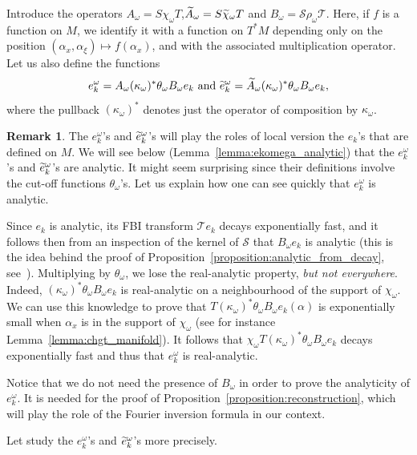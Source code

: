 \documentclass[10pt]{amsart}
\theoremstyle{definition}\newtheorem{defi}[theo]{Definition}\newtheorem{rema}[theo]{Remark}\newtheorem{exam}[theo]{Example}\newtheorem{exem}[theo]{Example}\newtheorem{nota}[theo]{Notation}
\newcommand{\clT}{\mathcal{T}}
\newcommand{\clS}{\mathcal{S}}
\let\oldtilde\tilde
\renewcommand*{\tilde}[1]{\mathchoice{\widetilde{#1}}{\widetilde{#1}}{\oldtilde{#1}}{\oldtilde{#1}}}
\begin{document}
Introduce the operators $A_\omega = S \chi_\omega T$,$\widetilde{A}_\omega = S\tilde{\chi}_\omega T$ and $B_\omega = \clS\rho_\omega \clT$. Here, if $f$ is a function on $M$, we identify it with a function on $T^* M$ depending only on the position $(\alpha_x,\alpha_\xi) \mapsto f(\alpha_x)$, and with the associated multiplication operator. Let us also define the functions
\begin{equation*}
e_k^\omega = A_\omega (\kappa_\omega)^* \theta_\omega B_\omega e_k \text{ and } \tilde{e}_k^\omega = \widetilde{A}_\omega (\kappa_\omega)^* \theta_\omega B_\omega e_k,
\end{equation*}
where the pullback $(\kappa_\omega)^*$ denotes just the operator of composition by $\kappa_\omega$.

\begin{rema}
The $e_k^\omega$'s and $\tilde{e}_k^\omega$'s will play the roles of local version the $e_k$'s that are defined on $M$. We will see below (Lemma~\ref{lemma:ekomega_analytic}) that the $e_k^\omega$'s and $\tilde{e}_k^\omega$'s are analytic. It might seem surprising since their definitions involve the cut-off functions $\theta_\omega$'s. Let us explain how one can see quickly that $e_k^\omega$ is analytic.

Since $e_k$ is analytic, its FBI transform $\clT e_k$ decays exponentially fast, and it follows then from an inspection of the kernel of $\clS$ that $B_\omega e_k$ is analytic (this is the idea behind the proof of Proposition~\ref{proposition:analytic_from_decay}, see~\cite[Lemma~2.6]{BJ20}). Multiplying by $\theta_\omega$, we lose the real-analytic property, \emph{but not everywhere}. Indeed, $(\kappa_\omega)^* \theta_\omega B_\omega e_k$ is real-analytic on a neighbourhood of the support of $\chi_\omega$. We can use this knowledge to prove that $T (\kappa_\omega)^* \theta_\omega B_\omega e_k(\alpha)$ is exponentially small when $\alpha_x$ is in the support of $\chi_\omega$ (see for instance Lemma~\ref{lemma:chgt_manifold}). It follows that $\chi_\omega T(\kappa_\omega)^* \theta_\omega B_\omega e_k$ decays exponentially fast and thus that $e_k^\omega$ is real-analytic.

Notice that we do not need the presence of $B_\omega$ in order to prove the analyticity of $e_k^\omega$. It is needed for the proof of Proposition~\ref{proposition:reconstruction}, which will play the role of the Fourier inversion formula in our context.
\end{rema}

Let study the $e_k^\omega$'s and $\tilde{e}_k^\omega$'s more precisely.
\end{document}
